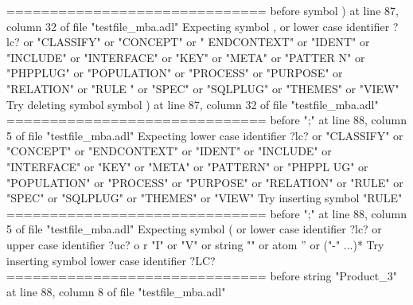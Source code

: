 {  ==============================\newline
  \newline
  before symbol ) at line 87, column 32 of file "testfile\_mba.adl"\newline
  Expecting symbol , or lower case identifier ?lc? or "CLASSIFY" or "CONCEPT" or "\newline
  ENDCONTEXT" or "IDENT" or "INCLUDE" or "INTERFACE" or "KEY" or "META" or "PATTER\newline
  N" or "PHPPLUG" or "POPULATION" or "PROCESS" or "PURPOSE" or "RELATION" or "RULE\newline
  " or "SPEC" or "SQLPLUG" or "THEMES" or "VIEW"\newline
  Try deleting symbol symbol ) at line 87, column 32 of file "testfile\_mba.adl"\newline
  \newline
  ==============================\newline
  \newline
  before ";" at line 88, column 5 of file "testfile\_mba.adl"\newline
  Expecting lower case identifier ?lc? or "CLASSIFY" or "CONCEPT" or "ENDCONTEXT"\newline
  or "IDENT" or "INCLUDE" or "INTERFACE" or "KEY" or "META" or "PATTERN" or "PHPPL\newline
  UG" or "POPULATION" or "PROCESS" or "PURPOSE" or "RELATION" or "RULE" or "SPEC"\newline
  or "SQLPLUG" or "THEMES" or "VIEW"\newline
  Try inserting symbol "RULE"\newline
  \newline
  ==============================\newline
  \newline
  before ";" at line 88, column 5 of file "testfile\_mba.adl"\newline
  Expecting symbol ( or lower case identifier ?lc? or upper case identifier ?uc? o\newline
  r "I" or "V" or string "" or atom '' or ("-" ...)*\newline
  Try inserting symbol lower case identifier ?LC?\newline
  \newline
  ==============================\newline
  \newline
  before string "Product\_3" at line 88, column 8 of file "testfile\_mba.adl"\newline
}
